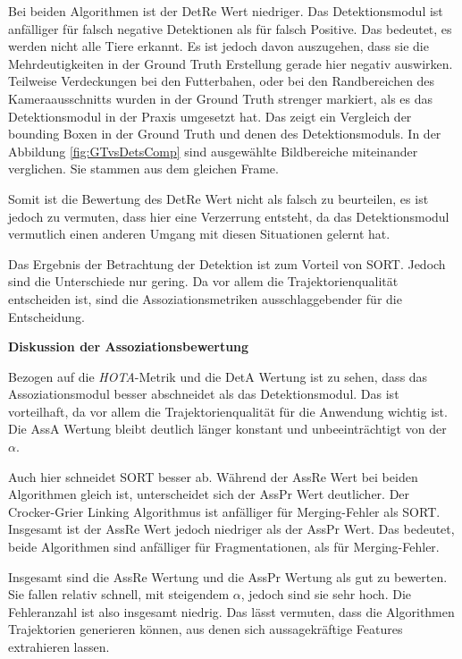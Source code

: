 Bei beiden Algorithmen ist der DetRe Wert niedriger. Das Detektionsmodul ist anfälliger für falsch negative Detektionen als für falsch Positive. Das bedeutet, es werden nicht alle Tiere erkannt. Es ist jedoch davon auszugehen, dass sie die Mehrdeutigkeiten in der Ground Truth Erstellung gerade hier negativ auswirken. Teilweise Verdeckungen bei den Futterbahen, oder bei den Randbereichen des Kameraausschnitts wurden in der Ground Truth strenger markiert, als es das Detektionsmodul in der Praxis umgesetzt hat. Das zeigt ein Vergleich der bounding Boxen in der Ground Truth und denen des Detektionsmoduls. In der Abbildung \ref{fig:GTvsDetsComp} sind ausgewählte Bildbereiche miteinander verglichen. Sie stammen aus dem gleichen Frame. 


Somit ist die Bewertung des DetRe Wert nicht als falsch zu beurteilen, es ist jedoch zu vermuten, dass hier eine Verzerrung entsteht, da das Detektionsmodul vermutlich einen anderen Umgang mit diesen Situationen gelernt hat.\par

Das Ergebnis der Betrachtung der Detektion ist zum Vorteil von SORT. Jedoch sind die Unterschiede nur gering. Da vor allem die Trajektorienqualität entscheiden ist, sind die Assoziationsmetriken ausschlaggebender für die Entscheidung.\dubpar


\textbf{Diskussion der Assoziationsbewertung}\par
Bezogen auf die \textit{HOTA}-Metrik und die DetA Wertung ist zu sehen, dass das Assoziationsmodul besser abschneidet als das Detektionsmodul. Das ist vorteilhaft, da vor allem die Trajektorienqualität für die Anwendung wichtig ist. Die AssA Wertung bleibt deutlich länger konstant und unbeeinträchtigt von der \(\alpha\). \par

Auch hier schneidet SORT besser ab. Während der AssRe Wert bei beiden Algorithmen gleich ist, unterscheidet sich der AssPr Wert deutlicher. Der  Crocker-Grier Linking Algorithmus ist anfälliger für Merging-Fehler als SORT. Insgesamt ist der AssRe Wert jedoch niedriger als der AssPr Wert. Das bedeutet, beide Algorithmen sind anfälliger für Fragmentationen, als für Merging-Fehler.\par

Insgesamt sind die AssRe Wertung und die AssPr Wertung als gut zu bewerten. Sie fallen relativ schnell, mit steigendem \(\alpha\), jedoch sind sie sehr hoch. Die Fehleranzahl ist also insgesamt niedrig. Das lässt vermuten, dass die Algorithmen Trajektorien generieren können, aus denen sich aussagekräftige Features extrahieren lassen.\dubpar

